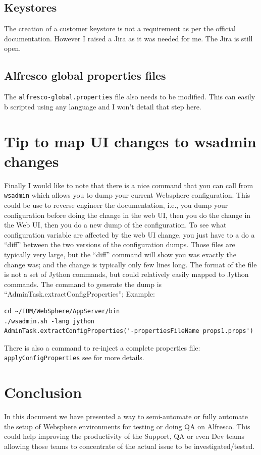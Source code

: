 \documentclass[10pt,a4]{article}
\begin{document}
\subsection{Keystores}
The creation of a customer keystore is not a requirement as per the official documentation. However I raised a Jira\cite{MNT-9737} as it was needed for me. The Jira is still open.

\subsection{Alfresco global properties files}
The {\tt alfresco-global.properties} file also needs to be modified. This can easily b scripted using any language and I won't detail that step here.

\section{Tip to map UI changes to wsadmin changes}
Finally I would like to note that there is a nice command that you can call from {\tt wsadmin} which allows you to dump your current Websphere configuration. This could be use to reverse engineer the documentation, i.e., you dump your configuration before doing the change in the web UI, then you do the change in the Web UI, then you do a new dump of the configuration.
To see what configuration variable are affected by the web UI change, you just have to a do a ``diff'' between the two versions of the configuration dumps. Those files are typically very large, but the ``diff'' command will show you was exactly the change was; and the change is typically only few lines long. The format of the file is not a set of Jython commands, but could relatively easily mapped to Jython commands.
The command to generate the dump is ``AdminTask.extractConfigProperties''; Example:
\begin{verbatim}
cd ~/IBM/WebSphere/AppServer/bin
./wsadmin.sh -lang jython 
AdminTask.extractConfigProperties('-propertiesFileName props1.props')
\end{verbatim}
There is also a command to re-inject a complete properties file: {\tt applyConfigProperties} see \cite{moreadmin} for more details.


\section{Conclusion}
In this document we have presented a way to semi-automate or fully automate the setup of Websphere environments for testing or doing QA on Alfresco. This could help improving the productivity of the Support, QA or even Dev teams allowing those teams to concentrate of the actual issue to be investigated/tested.
\end{document}
